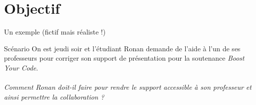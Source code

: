 \section{Objectif}

\begin{frame}{Un exemple (fictif mais réaliste !)}
  \begin{block}{Scénario}
  On est jeudi soir et l'étudiant Ronan demande de l'aide à l'un de ses
  professeurs pour corriger son support de présentation pour la soutenance
  \emph{Boost Your Code}.\\
  ~\\
  \emph{Comment Ronan doit-il faire pour rendre le support accessible à son
  professeur et ainsi permettre la collaboration ?}
  \end{block}
\end{frame}

